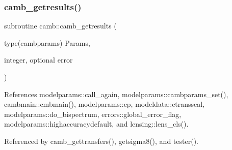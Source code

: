 \subsubsection{\texorpdfstring{camb\+\_\+getresults()}{camb\_getresults()}}
{\footnotesize\ttfamily subroutine camb\+::camb\+\_\+getresults (\begin{DoxyParamCaption}\item[{type(cambparams)}]{Params,  }\item[{integer, optional}]{error }\end{DoxyParamCaption})}



References modelparams\+::call\+\_\+again, modelparams\+::cambparams\+\_\+set(), cambmain\+::cmbmain(), modelparams\+::cp, modeldata\+::ctransscal, modelparams\+::do\+\_\+bispectrum, errors\+::global\+\_\+error\+\_\+flag, modelparams\+::highaccuracydefault, and lensing\+::lens\+\_\+cls().



Referenced by camb\+\_\+gettransfers(), getsigma8(), and tester().

